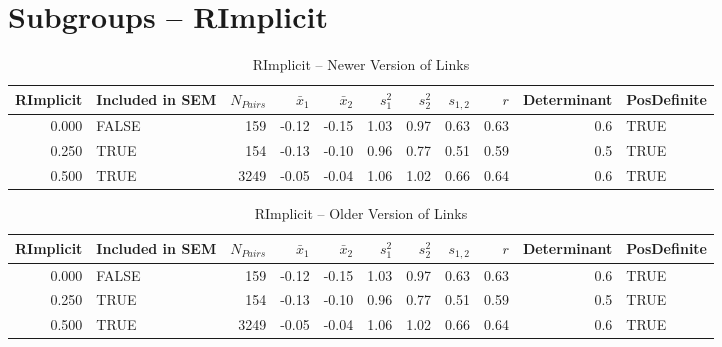 \documentclass{article}\usepackage[]{graphicx}\usepackage[]{color}
\begin{document}
\section{Subgroups --  RImplicit }%
\begin{table}[ht]
\centering
\begin{tabular}{rlrrrrrrrrl}
  \hline
RImplicit & Included in SEM & $N_{Pairs}$ & $\bar{x}_1$ & $\bar{x}_2$ & $s_1^2$ & $s_2^2$ & $s_{1,2}$ & $r$ & Determinant & PosDefinite \\ 
  \hline
0.000 & FALSE & 159 & -0.12 & -0.15 & 1.03 & 0.97 & 0.63 & 0.63 & 0.6 & TRUE \\ 
  0.250 & TRUE & 154 & -0.13 & -0.10 & 0.96 & 0.77 & 0.51 & 0.59 & 0.5 & TRUE \\ 
  0.500 & TRUE & 3249 & -0.05 & -0.04 & 1.06 & 1.02 & 0.66 & 0.64 & 0.6 & TRUE \\ 
   \hline
\end{tabular}
\caption{RImplicit -- Newer Version of Links} 
\end{table}
\begin{table}[ht]
\centering
\begin{tabular}{rlrrrrrrrrl}
  \hline
RImplicit & Included in SEM & $N_{Pairs}$ & $\bar{x}_1$ & $\bar{x}_2$ & $s_1^2$ & $s_2^2$ & $s_{1,2}$ & $r$ & Determinant & PosDefinite \\ 
  \hline
0.000 & FALSE & 159 & -0.12 & -0.15 & 1.03 & 0.97 & 0.63 & 0.63 & 0.6 & TRUE \\ 
  0.250 & TRUE & 154 & -0.13 & -0.10 & 0.96 & 0.77 & 0.51 & 0.59 & 0.5 & TRUE \\ 
  0.500 & TRUE & 3249 & -0.05 & -0.04 & 1.06 & 1.02 & 0.66 & 0.64 & 0.6 & TRUE \\ 
   \hline
\end{tabular}
\caption{RImplicit -- Older Version of Links} 
\end{table}
\end{document}
